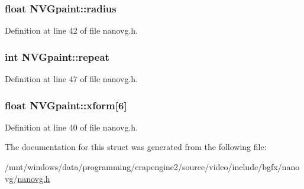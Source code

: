 \hypertarget{struct_n_v_gpaint_a796f17e83ffd2f59d7a48a5c0e062c55}{
\subsubsection[{radius}]{\setlength{\rightskip}{0pt plus 5cm}float N\+V\+Gpaint\+::radius}}\label{struct_n_v_gpaint_a796f17e83ffd2f59d7a48a5c0e062c55}


Definition at line 42 of file nanovg.\+h.

\hypertarget{struct_n_v_gpaint_a7f46b3d46ef04390791bdf1b032ef594}{
\subsubsection[{repeat}]{\setlength{\rightskip}{0pt plus 5cm}int N\+V\+Gpaint\+::repeat}}\label{struct_n_v_gpaint_a7f46b3d46ef04390791bdf1b032ef594}


Definition at line 47 of file nanovg.\+h.

\hypertarget{struct_n_v_gpaint_a2f486f2a6c76c0fd46a6ea58aa587194}{
\subsubsection[{xform}]{\setlength{\rightskip}{0pt plus 5cm}float N\+V\+Gpaint\+::xform\mbox{[}6\mbox{]}}}\label{struct_n_v_gpaint_a2f486f2a6c76c0fd46a6ea58aa587194}


Definition at line 40 of file nanovg.\+h.



The documentation for this struct was generated from the following file\+:\begin{DoxyCompactItemize}
\item 
/mnt/windows/data/programming/crapengine2/source/video/include/bgfx/nanovg/\hyperlink{nanovg_8h}{nanovg.\+h}\end{DoxyCompactItemize}
